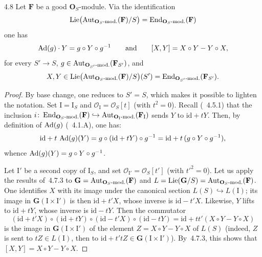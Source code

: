 \begin{proposition}{4.8}\label{II.4.8}
Let \(\mathbf{F}\) be a good \(\mathbf{O}_{S}\)-module. Via the identification
\[
\operatorname{Lie}\bigl(\operatorname{Aut}_{\mathbf{O}_{S}\textup{-mod.}}(\mathbf{F})/S\bigr)
  =\operatorname{End}_{\mathbf{O}_{S}\textup{-mod.}}(\mathbf{F})
\]
one has
\[
\operatorname{Ad}(g)\cdot Y=g\circ Y\circ g^{-1}
\qquad\text{and}\qquad
[X,Y]=X\circ Y-Y\circ X,
\]
for every \(S'\to S\), \(g\in\operatorname{Aut}_{\mathbf{O}_{S'}\textup{-mod.}}(\mathbf{F}_{S'})\), and
\[
X,Y\in\operatorname{Lie}\bigl(\operatorname{Aut}_{\mathbf{O}_{S}\textup{-mod.}}(\mathbf{F})/S\bigr)(S')
=\operatorname{End}_{\mathbf{O}_{S'}\textup{-mod.}}(\mathbf{F}_{S'}).
\]
\end{proposition}

\begin{proof}
{\renewcommand{\thefootnote}{(81)}}
By base change, one reduces to \(S'=S\), which makes it possible to lighten the
notation. Set \(\mathrm{I}=\mathrm{I}_{S}\) and
\(\mathcal{O}_{\mathrm{I}}=\mathcal{O}_{S}[t]\) (with \(t^{2}=0\)). Recall
(\cf~4.5.1) that the inclusion
\(i\colon\operatorname{End}_{\mathbf{O}_{S}\textup{-mod.}}(\mathbf{F})
\hookrightarrow\operatorname{Aut}_{\mathbf{O}_{\mathrm{I}}\textup{-mod.}}(\mathbf{F}_{\mathrm{I}})\)
sends \(Y\) to \(\mathrm{id}+tY\). Then, by definition of \(\operatorname{Ad}(g)\) (\cf~4.1.A), one
has:
\[
\mathrm{id}+t\,\operatorname{Ad}(g)(Y)
  =g\circ(\mathrm{id}+tY)\circ g^{-1}
  =\mathrm{id}+t\,(g\circ Y\circ g^{-1}),
\]
whence \(\operatorname{Ad}(g)(Y)=g\circ Y\circ g^{-1}\).

Let \(\mathrm{I}'\) be a second copy of \(\mathrm{I}_{S}\), and set
\(\mathcal{O}_{\mathrm{I}'}=\mathcal{O}_{S}[t']\) (with \(t'^{2}=0\)). Let us apply the
results of~4.7.3 to \(\mathbf{G}=\operatorname{Aut}_{\mathbf{O}_{S}\textup{-mod.}}(\mathbf{F})\) and
\(L=\operatorname{Lie}(\mathbf{G}/S)=\operatorname{Aut}_{\mathbf{O}_{S}\textup{-mod.}}(\mathbf{F})\). One identifies
\(X\) with its image under the canonical section \(L(S)\hookrightarrow L(\mathrm{I})\);
its image in \(\mathbf{G}(\mathrm{I}\times\mathrm{I}')\) is then \(\mathrm{id}+t'X\),
whose inverse is \(\mathrm{id}-t'X\). Likewise, \(Y\) lifts to \(\mathrm{id}+tY\),
whose inverse is \(\mathrm{id}-tY\). Then the commutator
\[
(\mathrm{id}+t'X)\circ(\mathrm{id}+tY)\circ(\mathrm{id}-t'X)\circ(\mathrm{id}-tY)
  =\mathrm{id}+tt'(X\circ Y-Y\circ X)
\]
is the image in \(\mathbf{G}(\mathrm{I}\times\mathrm{I}')\) of the element
\(Z=X\circ Y-Y\circ X\) of \(L(S)\) (indeed, \(Z\) is sent to \(tZ\in L(\mathrm{I})\),
then to \(\mathrm{id}+t'tZ\in\mathbf{G}(\mathrm{I}\times\mathrm{I}')\)). By~4.7.3,
this shows that \([X,Y]=X\circ Y-Y\circ X\).
\end{proof}

